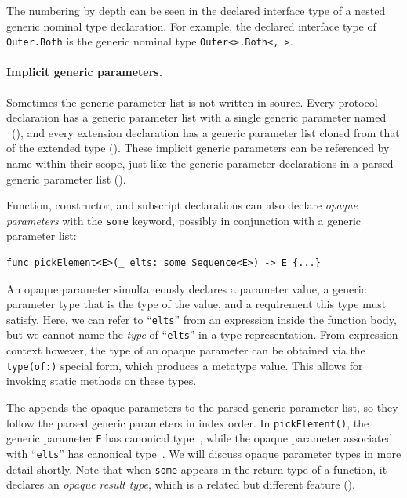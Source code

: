 \documentclass[../generics]{subfiles}
\begin{document}
The numbering by depth can be seen in the declared interface type of a nested generic nominal type declaration. For example, the declared interface type of \texttt{Outer.Both} is the generic nominal type \texttt{Outer<>.Both<, >}.

\paragraph{Implicit generic parameters.} Sometimes the generic parameter list is not written in source. Every protocol declaration has a generic parameter list with a single generic parameter named \IndexSelf\tSelf\ (), and every extension declaration has a generic parameter list cloned from that of the extended type (). These implicit generic parameters can be referenced by name within their scope, just like the generic parameter declarations in a parsed generic parameter list ().

Function, constructor, and subscript declarations can also declare \emph{opaque parameters} with the \texttt{some} keyword, possibly in conjunction with a generic parameter list:
\begin{Verbatim}
func pickElement<E>(_ elts: some Sequence<E>) -> E {...}
\end{Verbatim}
An opaque parameter simultaneously declares a parameter value, a generic parameter type that is the type of the value, and a requirement this type must satisfy. Here, we can refer to ``\texttt{elts}'' from an expression inside the function body, but we cannot name the \emph{type} of ``\texttt{elts}'' in a type representation. From expression context however, the type of an opaque parameter can be obtained via the \texttt{type(of:)} special form, which produces a metatype value. This allows for invoking static methods on these types.

The  appends the opaque parameters to the parsed generic parameter list, so they follow the parsed generic parameters in index order. In \texttt{pickElement()}, the generic parameter \texttt{E} has canonical type~\rT, while the opaque parameter associated with ``\texttt{elts}'' has canonical type~\rU. We will discuss opaque parameter types in more detail shortly. Note that when \texttt{some} appears in the return type of a function, it declares an \emph{opaque result type}, which is a related but different feature ().
\end{document}
